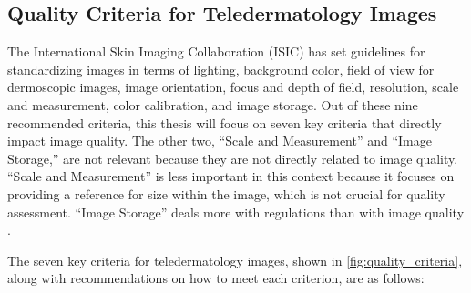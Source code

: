 \subsection{Quality Criteria for Teledermatology Images}
\label{sub:QualityCriteriaTeledermatology}
The International Skin Imaging Collaboration (ISIC) has set guidelines for standardizing images in terms of lighting, background color, field of view for dermoscopic images, image orientation, focus and depth of field, resolution, scale and measurement, color calibration, and image storage. Out of these nine recommended criteria, this thesis will focus on seven key criteria that directly impact image quality. The other two, “Scale and Measurement” and “Image Storage,” are not relevant because they are not directly related to image quality. “Scale and Measurement” is less important in this context because it focuses on providing a reference for size within the image, which is not crucial for quality assessment. “Image Storage” deals more with regulations than with image quality \autocite{TDCriteria}. \par
\vspace{\baselineskip}
\noindent
The seven key criteria for teledermatology images, shown in \autoref{fig:quality_criteria}, along with recommendations on how to meet each criterion, are as follows: \par
\vspace{\baselineskip}
